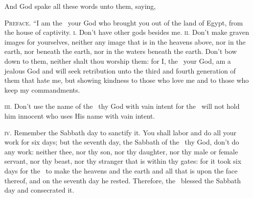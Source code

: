 
\begin{inparaenum}
   And God spake all these words unto them, saying,%

   \textsc{Preface.} ``I am the \lord\ your God who brought you out of the land of Egypt, from the house of captivity.%
   \textsc{i.} Don't have other gods besides me.%
   \textsc{ii.} Don't make graven images for yourselves, neither any image that is in the heavens above, nor in the earth, nor beneath the earth, nor in the waters beneath the earth.%
   Don't bow down to them, neither shalt thou worship them: for I, the \lord\ your God, am a jealous God and will seek retribution unto the third and fourth generation of them that hate me,%
   but showing kindness to those who love me and to those who keep my commandments.%

   \textsc{iii.} Don't use the name of the \lord\ thy God with vain intent for the \lord\ will not hold him innocent who uses His name with vain intent.%

   \textsc{iv.} Remember the Sabbath day to sanctify it.%
   You shall labor and do all your work for six days;%
   but the seventh day, the Sabbath of the \lord\ thy God, don't do any work: neither thee, nor thy son, nor thy daughter, nor thy male or female servant, nor thy beast, nor thy stranger that is within thy gates:%
   for it took six days for the \lord\ to make the heavens and the earth and all that is upon the face thereof, and on the seventh day he rested. Therefore, the \lord\ blessed the Sabbath day and consecrated it.%


\end{inparaenum}
